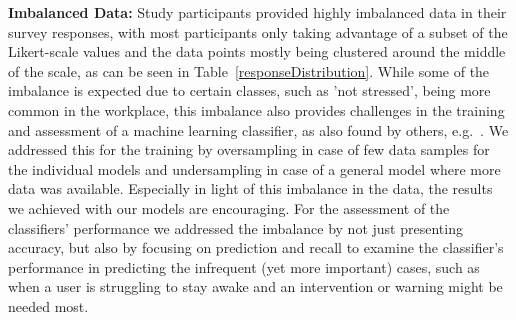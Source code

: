 \vspace{0.05in}
\noindent
\textbf{Imbalanced Data:}
Study participants provided highly imbalanced data in their survey responses, with most participants only taking advantage of a subset of the Likert-scale values and the data points mostly being clustered around the middle of the scale, as can be seen in Table~\ref{responseDistribution}. While some of the imbalance is expected due to certain classes, such as 'not stressed', being more common in the workplace, this imbalance also provides challenges in the training and assessment of a machine learning classifier, as also found by others, e.g.~\cite{Exler16}. We addressed this for the training by oversampling in case of few data samples for the individual models and undersampling in case of a general model where more data was available. Especially in light of this imbalance in the data, the results we achieved with our models are encouraging. For the assessment of the classifiers' performance we addressed the imbalance by not just presenting accuracy, but also by focusing on prediction and recall to examine the classifier's performance in predicting the infrequent (yet more important) cases, such as when a user is struggling to stay awake and an intervention or warning might be needed most. 

